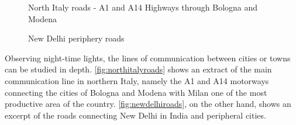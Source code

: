 \begin{figure}[h!]
    \centering
    \qquad
    \caption{North Italy roads - A1 and A14 Highways through Bologna and Modena}%
    \label{fig:northitalyroads}
\end{figure}

\begin{figure}
    \centering
    \qquad
    \caption{New Delhi periphery roads}%
    \label{fig:newdelhiroads}
\end{figure}
Observing night-time lights, the lines of communication between cities or towns can be studied in depth. \autoref{fig:northitalyroads} shows an extract of the main communication line in northern Italy, namely the A1 and A14 motorways connecting the cities of Bologna and Modena with Milan one of the most productive area of the country. \autoref{fig:newdelhiroads}, on the other hand, shows an excerpt of the roads connecting New Delhi in India and peripheral cities.

